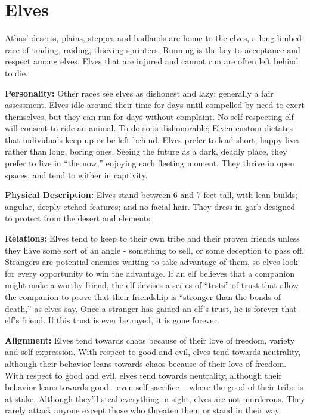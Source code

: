 \section{Elves}

Athas' deserts, plains, steppes and badlands are home to the elves, a long-limbed race of trading, raiding, thieving sprinters. Running is the key to acceptance and respect among elves. Elves that are injured and cannot run are often left behind to die.

\textbf{Personality:} Other races see elves as dishonest and lazy; generally a fair assessment. Elves idle around their time for days until compelled by need to exert themselves, but they can run for days without complaint. No self-respecting elf will consent to ride an animal. To do so is dishonorable; Elven custom dictates that individuals keep up or be left behind. Elves prefer to lead short, happy lives rather than long, boring ones. Seeing the future as a dark, deadly place, they prefer to live in ``the now,'' enjoying each fleeting moment. They thrive in open spaces, and tend to wither in captivity.

\textbf{Physical Description:} Elves stand between 6 and 7 feet tall, with lean builds; angular, deeply etched features; and no facial hair. They dress in garb designed to protect from the desert and elements.

\textbf{Relations:} Elves tend to keep to their own tribe and their proven friends unless they have some sort of an angle - something to sell, or some deception to pass off. Strangers are potential enemies waiting to take advantage of them, so elves look for every opportunity to win the advantage. If an elf believes that a companion might make a worthy friend, the elf devises a series of ``tests'' of trust that allow the companion to prove that their friendship is ``stronger than the bonds of death,'' as elves say. Once a stranger has gained an elf's trust, he is forever that elf's friend. If this trust is ever betrayed, it is gone forever.

\textbf{Alignment:} Elves tend towards chaos because of their love of freedom, variety and self-expression. With respect to good and evil, elves tend towards neutrality, although their behavior leans towards chaos because of their love of freedom. With respect to good and evil, elves tend towards neutrality, although their behavior leans towards good - even self-sacrifice -- where the good of their tribe is at stake. Although they'll steal everything in sight, elves are not murderous. They rarely attack anyone except those who threaten them or stand in their way.

